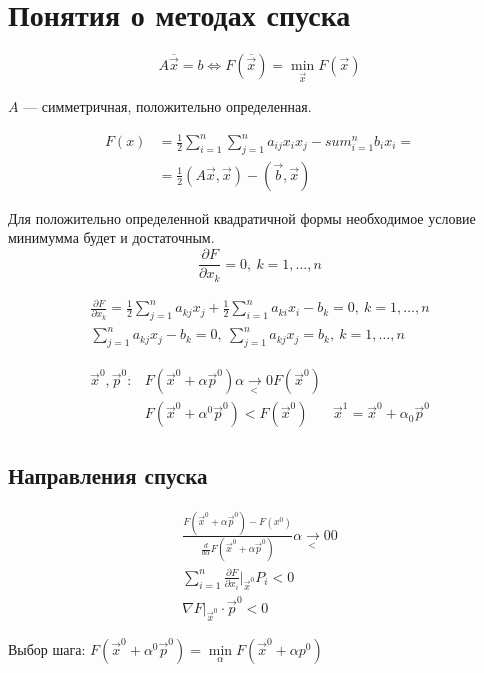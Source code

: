 \section{Понятия о методах спуска}

\[  
  A \overline{\vec{x}} = b \iff F(\overline{\vec{x}}) = \min_{\vec{x}}
  F(\vec{x})
\]

$A$ --- симметричная, положительно определенная.

\begin{align*}
  F(x) &= \frac 12 \sum_{i = 1}^n \sum_{j = 1}^n a_{ij} x_i x_j - sum_{i = 1}^n b_i x_i =\\ 
       &= \frac 12 (A\vec{x}, \vec{x}) - (\vec{b}, \vec{x})
\end{align*}

Для положительно определенной квадратичной формы необходимое условие минимумма
будет и достаточным.
\[
  \frac{\partial F}{\partial x_k} = 0,\ k = 1, \dotsc, n
\]

\begin{gather*}
  \frac{\partial F}{\partial x_k} = \frac 12 \sum_{j = 1}^n a_{kj}x_j + \frac 12
  \sum_{i = 1}^n a_{ki}x_i - b_k = 0,\ k = 1,\dotsc, n \\
  \sum_{j = 1}^n a_{kj} x_j - b_k = 0,\ \sum_{j = 1}^n a_{kj}x_j = b_k,\ k = 1,
  \dotsc, n
\end{gather*}

\begin{align*}
  \vec{x}^0, \vec{p}^0: &F(\vec{x}^0 + \alpha \vec{p}^0) \underset{<}{\alpha \to
                          0} F(\vec{x}^0)\\
                        &F(\vec{x}^0 + \alpha^0 \vec{p}^0) < F(\vec{x}^0)
                        &\vec{x}^1 = \vec{x}^0 + \alpha_0 \vec{p}^0
\end{align*}

\subsection{Направления спуска}
\begin{gather*}
  \frac{F(\vec{x}^0 + \alpha \vec{p}^0) - F(x^0)}{\frac{d}{d\alpha} F(\vec{x}^0
    + \alpha \vec{p}^0)} \underset{<}{\alpha \to 0} 0 \\
  \sum_{i = 1}^n \frac{\partial F}{\partial x_i} |_{\vec{x}^0} P_i < 0\\
  \nabla F |_{\vec{x}^0} \cdot \vec{p}^0 < 0
\end{gather*}

Выбор шага: $F(\vec x^0 + \alpha^0 \vec p^0) = \min\limits_\alpha F(\vec x^0 + \alpha p^0)$

